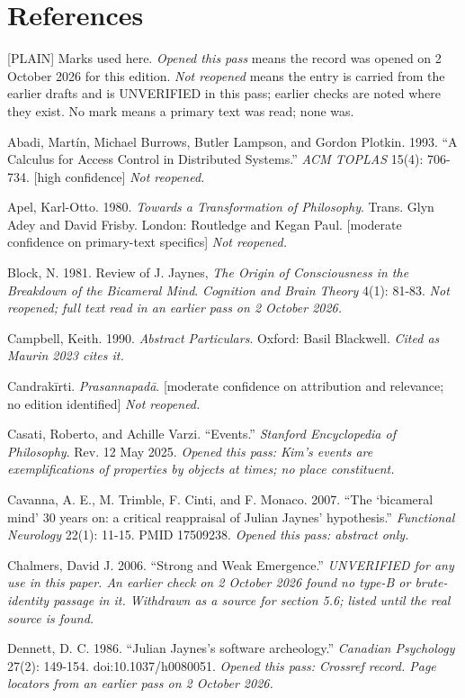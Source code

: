 \documentclass[11pt]{article}
\newcommand{\register}[1]{{\ttfamily\small #1}}
\begin{document}
\section*{References}

\register{[PLAIN]} Marks used here. \emph{Opened this pass} means the record was opened on 2 October 2026 for this edition. \emph{Not reopened} means the entry is carried from the earlier drafts and is UNVERIFIED in this pass; earlier checks are noted where they exist. No mark means a primary text was read; none was.

Abadi, Martín, Michael Burrows, Butler Lampson, and Gordon Plotkin. 1993. ``A Calculus for Access Control in Distributed Systems.'' \emph{ACM TOPLAS} 15(4): 706-734. [high confidence] \emph{Not reopened.}

Apel, Karl-Otto. 1980. \emph{Towards a Transformation of Philosophy}. Trans. Glyn Adey and David Frisby. London: Routledge and Kegan Paul. [moderate confidence on primary-text specifics] \emph{Not reopened.}

Block, N. 1981. Review of J. Jaynes, \emph{The Origin of Consciousness in the Breakdown of the Bicameral Mind}. \emph{Cognition and Brain Theory} 4(1): 81-83. \emph{Not reopened; full text read in an earlier pass on 2 October 2026.}

Campbell, Keith. 1990. \emph{Abstract Particulars}. Oxford: Basil Blackwell. \emph{Cited as Maurin 2023 cites it.}

Candrakīrti. \emph{Prasannapadā}. [moderate confidence on attribution and relevance; no edition identified] \emph{Not reopened.}

Casati, Roberto, and Achille Varzi. ``Events.'' \emph{Stanford Encyclopedia of Philosophy}. Rev. 12 May 2025. \emph{Opened this pass: Kim's events are exemplifications of properties by objects at times; no place constituent.}

Cavanna, A. E., M. Trimble, F. Cinti, and F. Monaco. 2007. ``The `bicameral mind' 30 years on: a critical reappraisal of Julian Jaynes' hypothesis.'' \emph{Functional Neurology} 22(1): 11-15. PMID 17509238. \emph{Opened this pass: abstract only.}

Chalmers, David J. 2006. ``Strong and Weak Emergence.'' \emph{UNVERIFIED for any use in this paper. An earlier check on 2 October 2026 found no type-B or brute-identity passage in it. Withdrawn as a source for section 5.6; listed until the real source is found.}

Dennett, D. C. 1986. ``Julian Jaynes's software archeology.'' \emph{Canadian Psychology} 27(2): 149-154. doi:10.1037/\allowbreak{}h0080051. \emph{Opened this pass: Crossref record. Page locators from an earlier pass on 2 October 2026.}
\end{document}
